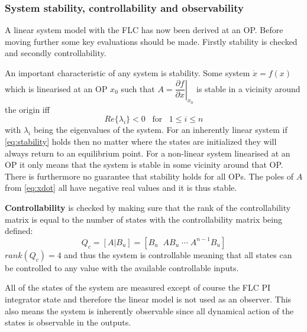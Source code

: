 \subsubsection{System stability, controllability and observability}
A linear system model with the FLC has now been derived at an OP. Before moving further some key evaluations should be made. Firstly stability is checked and secondly controllability. 

\medskip
An important characteristic of any system is stability. Some system $ \dot x = f(x) $ which is linearised at an OP $ x_0 $ such that $ A = \left. \dfrac{\partial f}{\partial x} \right| _{x_0} $ is stable in a vicinity around the origin iff
\begin{equation}\label{eq:stability}
	Re\{\lambda_i\} < 0 \;\;\; \text{for} \;\;\; 1 \leq i \leq n
\end{equation}
with $ \lambda_i $ being the eigenvalues of the system. For an inherently linear system if \cref{eq:stability} holds then no matter where the states are initialized they will always return to an equilibrium point. For a non-linear system linearised at an OP it only means that the system is stable in some vicinity around that OP. There is furthermore no guarantee that stability holds for all OPs. The poles of $ A $ from \cref{eq:xdot} all have negative real values and it is thus stable.

\smallskip
\textbf{Controllability} is checked by making sure that the rank of the controllability matrix is equal to the number of states with the controllability matrix being defined:
\begin{equation}\label{eq:controllability}
	Q_c = [A|B_u] = [B_u \;\; AB_u \; \cdots \; A^{n-1}B_u]
\end{equation}
$ rank(Q_c) = 4 $ and thus the system is controllable meaning that all states can be controlled to any value with the available controllable inputs.

\smallskip
All of the states of the system are measured except of course the FLC PI integrator state and therefore the linear model is not used as an observer. This also means the system is inherently observable since all dynamical action of the states is observable in the outputs.

